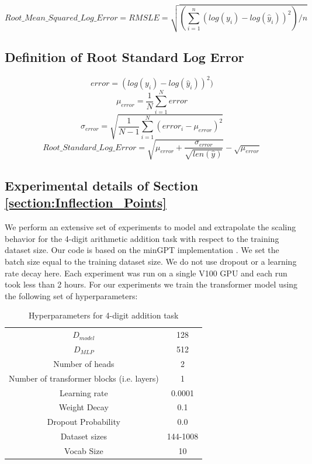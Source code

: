 \documentclass{article} %
\begin{document}
\[Root\_Mean\_Squared\_Log\_Error = RMSLE = \sqrt{(\sum_{i=1}^{n}(log(y_{i})-log(\hat{y}_{i}))^2)/n}\]

\subsection{Definition of Root Standard Log Error}
\label{section:definition_of_Root_Standard_Log_Error}

\[error = (log(y_{i})-log(\hat{y}_{i}))^2)\] 
\[\mu_{error} = \frac{1}{N}\sum_{i=1}^N error\]
\[\sigma_{error} = \sqrt{\frac{1}{N-1}\sum_{i=1}^N(error_i-\mu_{error})^2}\]
\[Root\_Standard\_Log\_Error = \sqrt{\mu_{error} + \frac{\sigma_{error}}{\sqrt{len(\hat{y})}}} - \sqrt{\mu_{error}}\] 


\subsection{Experimental details of Section \ref{section:Inflection_Points}}
\label{section:Inflection_points_experimental}
We perform an extensive set of experiments to model and extrapolate the scaling behavior for the 4-digit arithmetic addition task with respect to the training dataset size. Our code is based on the minGPT implementation \citep{Karpathy2020}. We set the batch size equal to the training dataset size. We do not use dropout or a learning rate decay here. Each experiment was run on a single V100 GPU and each run took less than 2 hours. For our experiments we train the transformer model using the following set of hyperparameters:
\begin{table}[hbt!]
    \centering
    \begin{tabular}{c|c}
         $D_{model}$ & 128 \\
         $D_{MLP}$ & 512 \\
         Number of heads & 2 \\
         Number of transformer blocks (i.e. layers) & 1 \\
         Learning rate & 0.0001\\
         Weight Decay & 0.1\\
         Dropout Probability & 0.0\\
         Dataset sizes & 144-1008 \\
         Vocab Size & 10 \\
         
    \end{tabular}
    \caption{Hyperparameters for 4-digit addition task}
    \label{tab:my_label}
\end{table}
\end{document}
